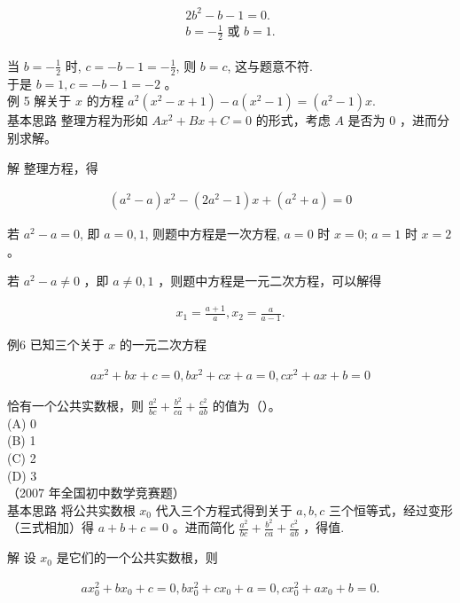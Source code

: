 \documentclass[10pt]{article}
\begin{document}
\begin{align*}
\begin{gathered}
2 b^{2}-b-1=0 . \\
b=-\frac{1}{2} \text { 或 } b=1 .
\end{gathered}
\end{align*}

当 $b=-\frac{1}{2}$ 时, $c=-b-1=-\frac{1}{2}$, 则 $b=c$, 这与题意不符.\\
于是 $b=1, c=-b-1=-2$ 。\\
例 5 解关于 $x$ 的方程 $a^{2}\left(x^{2}-x+1\right)-a\left(x^{2}-1\right)=\left(a^{2}-1\right) x$.\\
基本思路 整理方程为形如 $A x^{2}+B x+C=0$ 的形式，考虑 $A$ 是否为 0 ，进而分别求解。

解 整理方程，得

\begin{align*}
\left(a^{2}-a\right) x^{2}-\left(2 a^{2}-1\right) x+\left(a^{2}+a\right)=0
\end{align*}

若 $a^{2}-a=0$, 即 $a=0,1$, 则题中方程是一次方程, $a=0$ 时 $x=0$; $a=1$ 时 $x=2$ 。

若 $a^{2}-a \neq 0$ ，即 $a \neq 0,1$ ，则题中方程是一元二次方程，可以解得

\begin{align*}
x_{1}=\frac{a+1}{a}, x_{2}=\frac{a}{a-1} .
\end{align*}

例6 已知三个关于 $x$ 的一元二次方程

\begin{align*}
a x^{2}+b x+c=0, b x^{2}+c x+a=0, c x^{2}+a x+b=0
\end{align*}

恰有一个公共实数根，则 $\frac{a^{2}}{b c}+\frac{b^{2}}{c a}+\frac{c^{2}}{a b}$ 的值为（）。\\
(A) 0\\
(B) 1\\
(C) 2\\
(D) 3\\
（2007 年全国初中数学竞赛题）\\
基本思路 将公共实数根 $x_{0}$ 代入三个方程式得到关于 $a, b, c$ 三个恒等式，经过变形（三式相加）得 $a+b+c=0$ 。进而简化 $\frac{a^{2}}{b c}+\frac{b^{2}}{c a}+\frac{c^{2}}{a b}$ ，得值.

解 设 $x_{0}$ 是它们的一个公共实数根，则

\begin{align*}
a x_{0}^{2}+b x_{0}+c=0, b x_{0}^{2}+c x_{0}+a=0, c x_{0}^{2}+a x_{0}+b=0 .
\end{align*}
\end{document}
